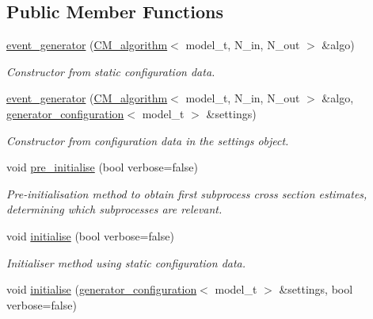 \subsection*{Public Member Functions}
\begin{DoxyCompactItemize}
\item 
\hypertarget{a00210_a535119cb75b01e2a00f064da31a0140d}{\hyperlink{a00210_a535119cb75b01e2a00f064da31a0140d}{event\-\_\-generator} (\hyperlink{a00070}{C\-M\-\_\-algorithm}$<$ model\-\_\-t, N\-\_\-in, N\-\_\-out $>$ \&algo)}\label{a00210_a535119cb75b01e2a00f064da31a0140d}

\begin{DoxyCompactList}\small\item\em Constructor from static configuration data. \end{DoxyCompactList}\item 
\hypertarget{a00210_af01bd872f0824f6317209958c9a169fc}{\hyperlink{a00210_af01bd872f0824f6317209958c9a169fc}{event\-\_\-generator} (\hyperlink{a00070}{C\-M\-\_\-algorithm}$<$ model\-\_\-t, N\-\_\-in, N\-\_\-out $>$ \&algo, \hyperlink{a00237}{generator\-\_\-configuration}$<$ model\-\_\-t $>$ \&settings)}\label{a00210_af01bd872f0824f6317209958c9a169fc}

\begin{DoxyCompactList}\small\item\em Constructor from configuration data in the settings object. \end{DoxyCompactList}\item 
void \hyperlink{a00210_aa214b8648397f14265712284546a780f}{pre\-\_\-initialise} (bool verbose=false)
\begin{DoxyCompactList}\small\item\em Pre-\/initialisation method to obtain first subprocess cross section estimates, determining which subprocesses are relevant. \end{DoxyCompactList}\item 
\hypertarget{a00210_ae49737ea37a84e439ad6c59c165103b4}{void \hyperlink{a00210_ae49737ea37a84e439ad6c59c165103b4}{initialise} (bool verbose=false)}\label{a00210_ae49737ea37a84e439ad6c59c165103b4}

\begin{DoxyCompactList}\small\item\em Initialiser method using static configuration data. \end{DoxyCompactList}\item 
\hypertarget{a00210_af128fad7c017fceeb45a0ef89b12993c}{void \hyperlink{a00210_af128fad7c017fceeb45a0ef89b12993c}{initialise} (\hyperlink{a00237}{generator\-\_\-configuration}$<$ model\-\_\-t $>$ \&settings, bool verbose=false)}\label{a00210_af128fad7c017fceeb45a0ef89b12993c}


\end{DoxyCompactItemize}
